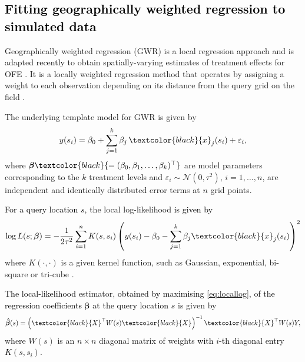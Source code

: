 \documentclass[a4paper]{article} 	%
\newcommand{\N}{\mathcal{N}}
\newcommand{\revision}[1]{\textcolor{black}{#1}}
\begin{document}


\subsection{\revision{Fitting geographically weighted regression to simulated data}}\label{sec:gwr}

Geographically weighted regression (GWR) is a local regression approach and is adapted \revision{recently} to obtain spatially-varying estimates of treatment effects for OFE \parencite{Rakshit2020Novel}.  It is a locally weighted regression method that operates by assigning a weight to each observation depending on its distance from the query grid on the field \parencite{Paez2002General}. 


The underlying template model for GWR is given by 
\begin{equation}\label{eq:basicgwr}
	y(s_i) =  \beta_0 + \sum_{j=1}^{k} \beta_j \, \revision{x}_j(s_i) + \varepsilon_i, 
\end{equation}
where $\bm{\beta}\revision{ = (\beta_0, \beta_{1}, \ldots, \beta_{k})^{\top}}$ are model parameters corresponding to the $k$ treatment \revision{levels} and $\varepsilon_{i} \sim \N(0,\tau^2)$,  $i=1,\ldots,n$,  are independent and identically distributed error terms at $n$ grid points. 

\revision{For a query location $s$,} the local log-likelihood \revision{is given by} 
\begin{eqnarray}\label{eq:locallog}
	\log L(s; \bm{\beta}) = - \frac{1}{2\tau^2}\sum_{i=1}^{n}K(s,s_i)\left( y(s_i) -\beta_0 - \sum_{j=1}^{k}\beta_j \revision{x}_j(s_i) \right)^2 
\end{eqnarray}
where $K(\cdot,\cdot)$ is a given kernel function, such as Gaussian, exponential, bi-square or tri-cube \parencite{Gollini2015GWmodel}. 

\revision{The local-likelihood} estimator,  \revision{obtained by maximising \eqref{eq:locallog},} of \revision{the regression coefficients $\bm{\beta}$ at the query location $s$} is given by  
\begin{eqnarray}\label{eq:betahat}
	\bm{\hat{\beta}}(s) = \left( \revision{X}^\top W(s) \revision{X} \right)^{-1}\revision{X}^\top W(s) Y,
\end{eqnarray}
where $W(s)$ is an $n\times n$ diagonal matrix of weights \revision{with $i$-th diagonal entry $K(s,s_i)$}. 
\end{document}

